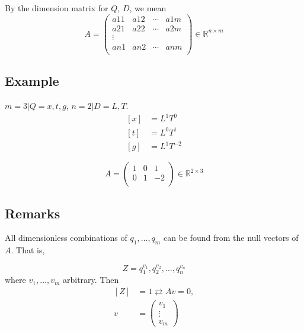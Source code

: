 \documentclass[12pt]{article}
\begin{document}
By the dimension matrix for $Q$, $D$, we mean
\begin{equation}
  A =
  \begin{pmatrix}
    a11 & a12 & \cdots & a1m \\
    a21 & a22 & \cdots & a2m \\
    \vdots & & & \\
    an1 & an2 & \cdots & anm \\
  \end{pmatrix}
  \in \mathbb{R}^{n\times m}
\end{equation}

\subsection{Example}
$m = 3 | Q = {x, t, g}$, $n = 2 | D = {L, T}$.
\begin{equation}
  \begin{aligned}
    [x] &= L^1 T^0 \\
    [t] &= L^0 T^1 \\
    [g] &= L^1 T^{-2}
  \end{aligned}
\end{equation}

\begin{equation}
  A =
  \begin{pmatrix}
    1 & 0 & 1 \\
    0 & 1 & -2 \\
  \end{pmatrix}
  \in \mathbb{R}^{2\times3}
\end{equation}

\subsection{Remarks}
All dimensionless combinations of $q_1,\ldots,q_m$ can be found from the null
vectors of $A$. That is,

$$Z = q_1^{v_1}, q_2^{v_2}, \ldots, q_n^{v_n}$$ where $v_1, \ldots, v_m$
arbitrary. Then
\begin{equation}
  \begin{aligned}
    [Z] &= 1 \rightleftarrows Av=0, \\
    v &= \begin{pmatrix} v_1 \\ \vdots \\ v_m \end{pmatrix}
  \end{aligned}
\end{equation}
\end{document}
